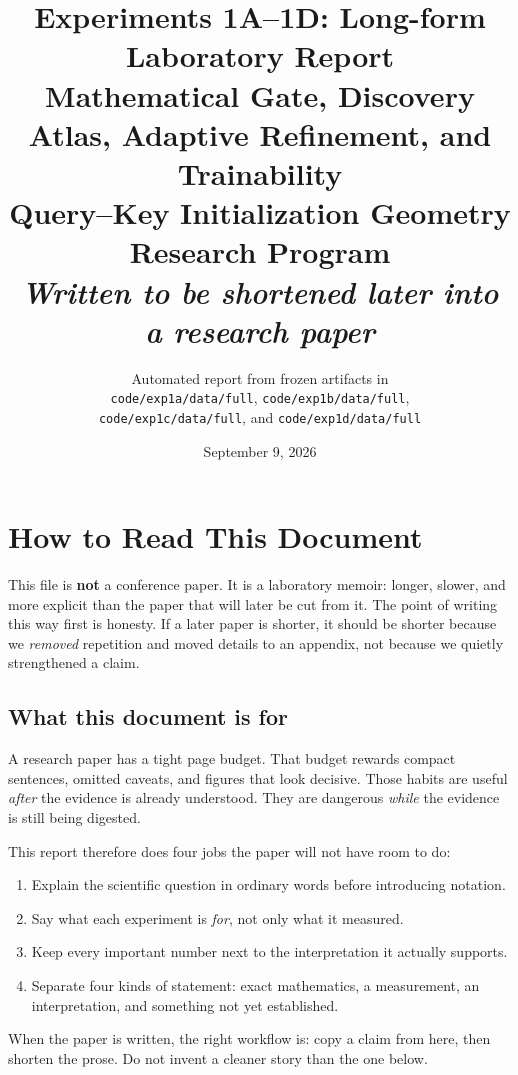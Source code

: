 \documentclass[11pt,a4paper]{report}
\title{%
  \textbf{Experiments 1A--1D: Long-form Laboratory Report}\\[0.45em]
  \large Mathematical Gate, Discovery Atlas, Adaptive Refinement, and Trainability\\
  \normalsize Query--Key Initialization Geometry Research Program\\[0.6em]
  \large\textit{Written to be shortened later into a research paper}
}
\author{%
  Automated report from frozen artifacts in\\
  \texttt{code/exp1a/data/full}, \texttt{code/exp1b/data/full},\\
  \texttt{code/exp1c/data/full}, and \texttt{code/exp1d/data/full}
}
\date{September 9, 2026}
\begin{document}
\hypersetup{pageanchor=false}
\maketitle
\clearpage
\hypersetup{pageanchor=true}
\tableofcontents
\clearpage
{}

\chapter{How to Read This Document}

This file is \textbf{not} a conference paper. It is a laboratory memoir: longer, slower, and more explicit than the paper that will later be cut from it. The point of writing this way first is honesty. If a later paper is shorter, it should be shorter because we \emph{removed} repetition and moved details to an appendix, not because we quietly strengthened a claim.

\section{What this document is for}

A research paper has a tight page budget. That budget rewards compact sentences, omitted caveats, and figures that look decisive. Those habits are useful \emph{after} the evidence is already understood. They are dangerous \emph{while} the evidence is still being digested.

This report therefore does four jobs the paper will not have room to do:
\begin{enumerate}[leftmargin=*]
  \item Explain the scientific question in ordinary words before introducing notation.
  \item Say what each experiment is \emph{for}, not only what it measured.
  \item Keep every important number next to the interpretation it actually supports.
  \item Separate four kinds of statement: exact mathematics, a measurement, an interpretation, and something not yet established.
\end{enumerate}

When the paper is written, the right workflow is: copy a claim from here, then shorten the prose. Do not invent a cleaner story than the one below.
\end{document}
